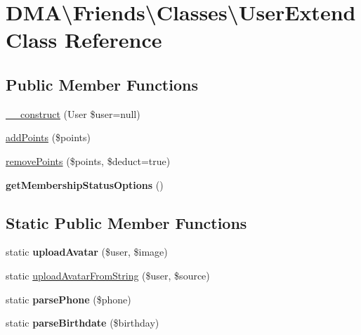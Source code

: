 \hypertarget{classDMA_1_1Friends_1_1Classes_1_1UserExtend}{}\section{D\+M\+A\textbackslash{}Friends\textbackslash{}Classes\textbackslash{}User\+Extend Class Reference}
\label{classDMA_1_1Friends_1_1Classes_1_1UserExtend}
\subsection*{Public Member Functions}
\begin{DoxyCompactItemize}
\item 
\hyperlink{classDMA_1_1Friends_1_1Classes_1_1UserExtend_aa399d503ccb972cb46171bd7cc2fbadf}{\+\_\+\+\_\+construct} (User \$user=null)
\item 
\hyperlink{classDMA_1_1Friends_1_1Classes_1_1UserExtend_ae2d0cddf99425d8ffbe2ed2c74372024}{add\+Points} (\$points)
\item 
\hyperlink{classDMA_1_1Friends_1_1Classes_1_1UserExtend_a72299c6e170b749617a262f18a8d7d67}{remove\+Points} (\$points, \$deduct=true)
\item 
\hypertarget{classDMA_1_1Friends_1_1Classes_1_1UserExtend_ac1de8e9326eaa1466503bf34fa0a3748}{}{\bfseries get\+Membership\+Status\+Options} ()\label{classDMA_1_1Friends_1_1Classes_1_1UserExtend_ac1de8e9326eaa1466503bf34fa0a3748}

\end{DoxyCompactItemize}
\subsection*{Static Public Member Functions}
\begin{DoxyCompactItemize}
\item 
\hypertarget{classDMA_1_1Friends_1_1Classes_1_1UserExtend_a0052edba29ca35647646bd33a05d9ccf}{}static {\bfseries upload\+Avatar} (\$user, \$image)\label{classDMA_1_1Friends_1_1Classes_1_1UserExtend_a0052edba29ca35647646bd33a05d9ccf}

\item 
static \hyperlink{classDMA_1_1Friends_1_1Classes_1_1UserExtend_afdb44d04557d6679074fa0399f0ce843}{upload\+Avatar\+From\+String} (\$user, \$source)
\item 
\hypertarget{classDMA_1_1Friends_1_1Classes_1_1UserExtend_aee1fe63ac574c2a6acabebcc00f2b4db}{}static {\bfseries parse\+Phone} (\$phone)\label{classDMA_1_1Friends_1_1Classes_1_1UserExtend_aee1fe63ac574c2a6acabebcc00f2b4db}

\item 
\hypertarget{classDMA_1_1Friends_1_1Classes_1_1UserExtend_a02c168a2fdff54bad066263b4143c285}{}static {\bfseries parse\+Birthdate} (\$birthday)\label{classDMA_1_1Friends_1_1Classes_1_1UserExtend_a02c168a2fdff54bad066263b4143c285}

\end{DoxyCompactItemize}
